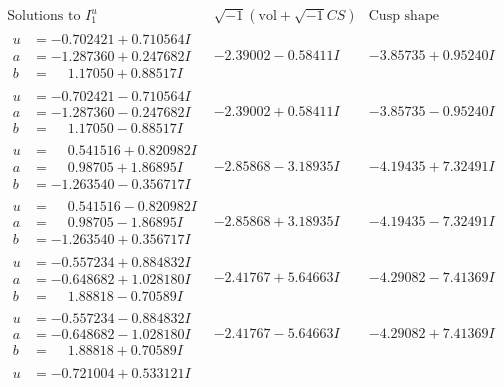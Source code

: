 \documentclass[1p]{elsarticle_modified}
\theoremstyle{definition}
\newcommand{\I}{\sqrt{-1}}
\begin{document}
$$\begin{array}{c|c|c}  
\text{Solutions to }I^u_{1}& \I (\text{vol} + \sqrt{-1}CS) & \text{Cusp shape}\\
 \hline 
\begin{aligned}
u &= -0.702421 + 0.710564 I \\
a &= -1.287360 + 0.247682 I \\
b &= \phantom{-}1.17050 + 0.88517 I\end{aligned}
 & -2.39002 - 0.58411 I & -3.85735 + 0.95240 I \\ \hline\begin{aligned}
u &= -0.702421 - 0.710564 I \\
a &= -1.287360 - 0.247682 I \\
b &= \phantom{-}1.17050 - 0.88517 I\end{aligned}
 & -2.39002 + 0.58411 I & -3.85735 - 0.95240 I \\ \hline\begin{aligned}
u &= \phantom{-}0.541516 + 0.820982 I \\
a &= \phantom{-}0.98705 + 1.86895 I \\
b &= -1.263540 - 0.356717 I\end{aligned}
 & -2.85868 - 3.18935 I & -4.19435 + 7.32491 I \\ \hline\begin{aligned}
u &= \phantom{-}0.541516 - 0.820982 I \\
a &= \phantom{-}0.98705 - 1.86895 I \\
b &= -1.263540 + 0.356717 I\end{aligned}
 & -2.85868 + 3.18935 I & -4.19435 - 7.32491 I \\ \hline\begin{aligned}
u &= -0.557234 + 0.884832 I \\
a &= -0.648682 + 1.028180 I \\
b &= \phantom{-}1.88818 - 0.70589 I\end{aligned}
 & -2.41767 + 5.64663 I & -4.29082 - 7.41369 I \\ \hline\begin{aligned}
u &= -0.557234 - 0.884832 I \\
a &= -0.648682 - 1.028180 I \\
b &= \phantom{-}1.88818 + 0.70589 I\end{aligned}
 & -2.41767 - 5.64663 I & -4.29082 + 7.41369 I \\ \hline\begin{aligned}
u &= -0.721004 + 0.533121 I \\

\end{aligned}
\end{array}$$
\end{document}
